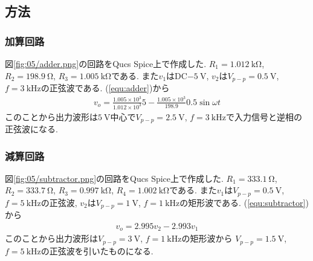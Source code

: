 \subsection{方法}
\subsubsection{加算回路}
図\ref{fig:05/adder.png}の回路をQucs Spice上で作成した.
$R_1=1.012\ \si{\kilo\ohm}$, $R_2=198.9\ \si{\ohm}$, $R_3=1.005\ \si{\kilo\ohm}$である.
また$v_1$はDC$-5\ \si{\volt}$, $v_2$は$V_{p-p}=0.5\ \si{\volt}$, $f=3\ \si{\kilo\hertz}$の正弦波である.
(\ref{equ:adder})から
\begin{align}
  v_o=\frac{1.005\times10^3}{1.012\times10^3}5-\frac{1.005\times10^3}{198.9}0.5\sin\omega t
\end{align}
このことから出力波形は$5\ \si{\volt}$中心で$V_{p-p}=2.5\ \si{\volt}$, $f=3\ \si{\kilo\hertz}$で入力信号と逆相の正弦波になる.
\subsubsection{減算回路}
図\ref{fig:05/subtractor.png}の回路をQucs Spice上で作成した.
$R_1=333.1\ \si{\ohm}$, $R_2=333.7\ \si{\ohm}$, $R_3=0.997\ \si{\kilo\ohm}$, $R_4=1.002\ \si{\kilo\ohm}$である.
また$v_1$は$V_{p-p}=0.5\ \si{\volt}$, $f=5\ \si{\kilo\hertz}$の正弦波, $v_2$は$V_{p-p}=1\ \si{\volt}$, $f=1\ \si{\kilo\hertz}$の矩形波である.
(\ref{equ:subtractor})から
\begin{align}
  v_o=2.995v_2-2.993v_1
\end{align}
このことから出力波形は$V_{p-p}=3\ \si{\volt}$, $f=1\ \si{\kilo\hertz}$の矩形波から
$V_{p-p}=1.5\ \si{\volt}$, $f=5\ \si{\kilo\hertz}$の正弦波を引いたものになる.